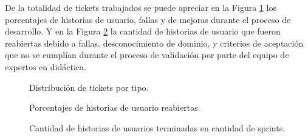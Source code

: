 De la totalidad de tickets trabajados se puede apreciar en la Figura \ref{tickets_by_type} los porcentajes de historias de usuario, fallas y de mejoras durante el proceso de desarrollo. Y en la Figura \ref{user_story_perc} la cantidad de historias de usuario que fueron reabiertas debido a fallas, desconocimiento de dominio, y criterios de aceptación que no se cumplían durante el proceso de validación por parte del equipo de expertos en didáctica.

\begin{figure}[H]
\centering
{}
\caption{Distribución de tickets por tipo.}
  \label{tickets_by_type}
\end{figure}

\begin{figure}[H]
\centering
{}
\caption{Porcentajes de historias de usuario reabiertas.}
  \label{user_story_perc}
\end{figure}



\mydata

\begin{figure}[H]
\centering
{}
\caption{Cantidad de historias de usuarios terminadas en cantidad de sprints.}
  \label{sprint_perc}
\end{figure}
